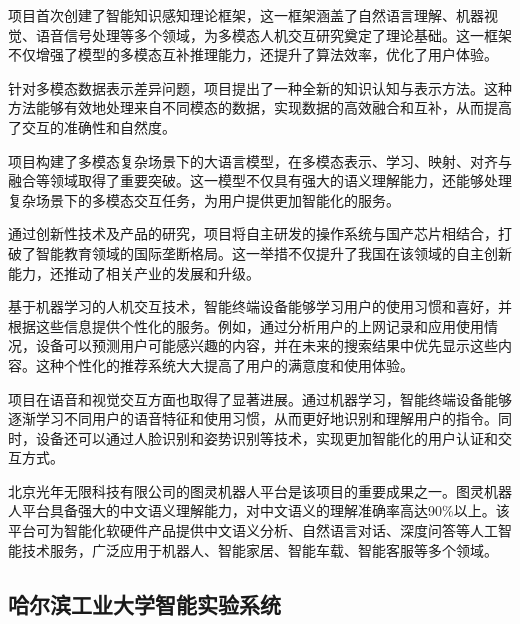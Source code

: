 

项目首次创建了智能知识感知理论框架，这一框架涵盖了自然语言理解、机器视觉、语音信号处理等多个领域，为多模态人机交互研究奠定了理论基础。这一框架不仅增强了模型的多模态互补推理能力，还提升了算法效率，优化了用户体验。



针对多模态数据表示差异问题，项目提出了一种全新的知识认知与表示方法。这种方法能够有效地处理来自不同模态的数据，实现数据的高效融合和互补，从而提高了交互的准确性和自然度。



项目构建了多模态复杂场景下的大语言模型，在多模态表示、学习、映射、对齐与融合等领域取得了重要突破。这一模型不仅具有强大的语义理解能力，还能够处理复杂场景下的多模态交互任务，为用户提供更加智能化的服务。



通过创新性技术及产品的研究，项目将自主研发的操作系统与国产芯片相结合，打破了智能教育领域的国际垄断格局。这一举措不仅提升了我国在该领域的自主创新能力，还推动了相关产业的发展和升级。


基于机器学习的人机交互技术，智能终端设备能够学习用户的使用习惯和喜好，并根据这些信息提供个性化的服务。例如，通过分析用户的上网记录和应用使用情况，设备可以预测用户可能感兴趣的内容，并在未来的搜索结果中优先显示这些内容。这种个性化的推荐系统大大提高了用户的满意度和使用体验。



项目在语音和视觉交互方面也取得了显著进展。通过机器学习，智能终端设备能够逐渐学习不同用户的语音特征和使用习惯，从而更好地识别和理解用户的指令。同时，设备还可以通过人脸识别和姿势识别等技术，实现更加智能化的用户认证和交互方式。



北京光年无限科技有限公司的图灵机器人平台是该项目的重要成果之一。图灵机器人平台具备强大的中文语义理解能力，对中文语义的理解准确率高达90\%以上。该平台可为智能化软硬件产品提供中文语义分析、自然语言对话、深度问答等人工智能技术服务，广泛应用于机器人、智能家居、智能车载、智能客服等多个领域。

\subsection{哈尔滨工业大学智能实验系统}\label{哈尔滨工业大学智能实验系统}

